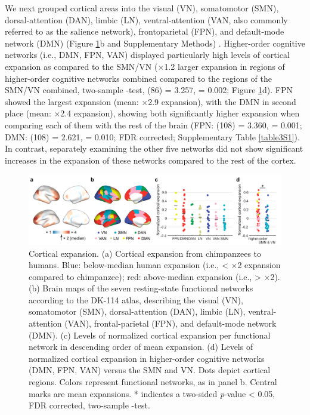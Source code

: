\begin{refsection}
We next grouped cortical areas into the visual (VN), somatomotor (SMN), dorsal-attention (DAN), limbic (LN), ventral-attention (VAN, also commonly referred to as the salience network), frontoparietal (FPN), and default-mode network (DMN) (Figure \ref{harFig2}b and Supplementary Methods) \citep{thomas2011organization}. Higher-order cognitive networks (i.e., DMN, FPN, VAN) displayed particularly high levels of cortical expansion as compared to the SMN/VN ($\times$1.2 larger expansion in regions of higher-order cognitive networks combined compared to the regions of the SMN/VN combined, two-sample \tvaldf-test, \tvaldf(86) = 3.257, \pval = 0.002; Figure \ref{harFig2}d). FPN showed the largest expansion (mean: $\times$2.9 expansion), with the DMN in second place (mean: $\times$2.4 expansion), showing both significantly higher expansion when comparing each of them with the rest of the brain (FPN: \tvaldf(108) = 3.360, \pval = 0.001; DMN: \tvaldf(108) = 2.621, \pval = 0.010; FDR corrected; Supplementary Table \ref{table3S1}). In contrast, separately examining the other five networks did not show significant increases in the expansion of these networks compared to the rest of the cortex.

\begin{figure}[h]
    \centering
    \includegraphics[width=\linewidth]{images/harFig2.png}
    \caption{Cortical expansion. (a) Cortical expansion from chimpanzees to humans. Blue: below-median human expansion (i.e., < $\times$2 expansion compared to chimpanzee); red: above-median expansion (i.e., > $\times$2). (b) Brain maps of the seven resting-state functional networks according to the DK-114 atlas, describing the visual (VN), somatomotor (SMN), dorsal-attention (DAN), limbic (LN), ventral-attention (VAN), frontal-parietal (FPN), and default-mode network (DMN). (c) Levels of normalized cortical expansion per functional network in descending order of mean expansion. (d) Levels of normalized cortical expansion in higher-order cognitive networks (DMN, FPN, VAN) versus the SMN and VN. Dots depict cortical regions. Colors represent functional networks, as in panel b. Central marks are mean expansions. * indicates a two-sided \textit{p}-value < 0.05, FDR corrected, two-sample \tvaldf-test.}
    \label{harFig2}
\end{figure}


\end{refsection}
